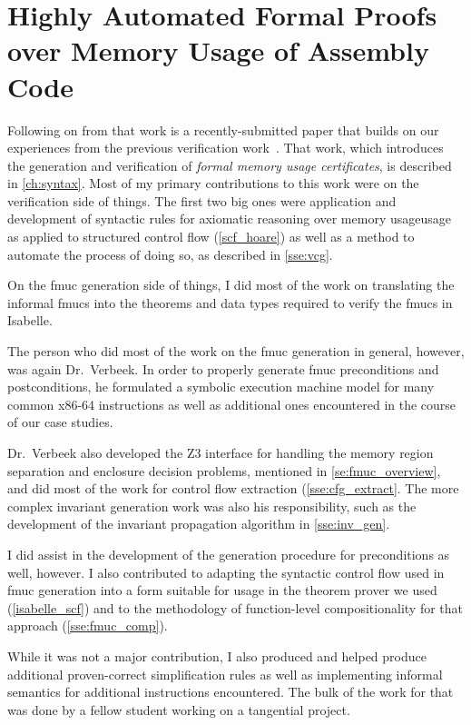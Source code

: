 \section*{Highly Automated Formal Proofs
  over Memory Usage of Assembly Code}\label{attribute2}
Following on from that work is a recently-submitted paper
that builds on our experiences from the previous verification
work~\citep{popl2019underreview}. That work,
which introduces the generation and verification of
\emph{formal memory usage certificates}, is described in \cref{ch:syntax}.
Most of my primary contributions to this work were on the verification side of things.
The first two big ones were application and development of syntactic rules
for axiomatic reasoning over memory usageusage
as applied to structured control flow (\cref{scf_hoare})
as well as a method to automate the process of doing so, 
as described in \cref{sse:vcg}.

On the \ac{fmuc} generation side of things,
I did most of the work on translating the informal \acp{fmuc}
into the theorems and data types required to verify the \acp{fmuc} in Isabelle.

The person who did most of the work on the \ac{fmuc} generation in general,
however, was again Dr.~Verbeek.
In order to properly generate \ac{fmuc} preconditions and postconditions,
he formulated a symbolic execution machine model for many common x86-64 instructions
as well as additional ones encountered in the course of our case studies.

Dr.~Verbeek also developed the Z3 interface
for handling the memory region separation and enclosure decision problems,
mentioned in \cref{se:fmuc_overview},
and did most of the work for control flow extraction (\cref{sse:cfg_extract}.
The more complex invariant generation work was also his responsibility,
such as the development of the invariant propagation algorithm in \cref{sse:inv_gen}.

I did assist in the development of the generation procedure for preconditions as well,
however.
I also contributed to adapting the syntactic control flow used in \ac{fmuc} generation
into a form suitable for usage in the theorem prover we used (\cref{isabelle_scf})
and to the methodology of function-level compositionality for that approach
(\cref{sse:fmuc_comp}).

While it was not a major contribution,
I also produced and helped produce additional proven-correct simplification rules
as well as implementing informal semantics for additional instructions encountered.
The bulk of the work for that was done by a fellow student
working on a tangential project.

